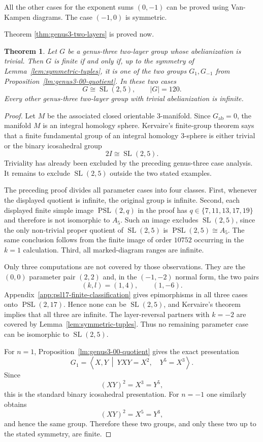 \documentclass{article}
\newtheorem{theorem}{Theorem}[section]
\begin{document}
All the other cases for the exponent sums $(0,-1)$ can be proved using Van-Kampen diagrams. The case $(-1,0)$ is symmetric.

Theorem \ref {thm:genus3-two-layers} is proved now.

\begin{theorem}
\label{thm:genus3-two-layer-finite-reduction}
Let $G$ be a genus-three two-layer group whose abelianization is trivial.
Then $G$ is finite if and only if, up to the symmetry of
Lemma~\ref{lem:symmetric-tuples}, it is one of the two groups $G_1,G_{-1}$
from Proposition~\ref{lm:genus3-00-quotient}.  In these two cases
\[
       G\cong\operatorname{SL}(2,5),
       \qquad |G|=120.
\]
Every other genus-three two-layer group with trivial abelianization is
infinite.
\end{theorem}

\begin{proof}
Let $M$ be the associated closed orientable $3$-manifold.  Since
$G_{\mathrm{ab}}=0$, the manifold $M$ is an integral homology sphere.
Kervaire's finite-group theorem says that a finite fundamental group of an
integral homology $3$-sphere is either trivial or the binary icosahedral
group
\[
       2I\cong\operatorname{SL}(2,5).
\]
Triviality has already been excluded by the preceding genus-three case
analysis.  It remains to exclude $\operatorname{SL}(2,5)$ outside the two
stated examples.

The preceding proof divides all parameter cases into four classes.  First,
whenever the displayed quotient is infinite, the original group is infinite.
Second, each displayed finite simple image
$\operatorname{PSL}(2,q)$ in the proof has
$q\in\{7,11,13,17,19\}$ and therefore is not isomorphic to $A_5$.
Such an image excludes $\operatorname{SL}(2,5)$, since the only non-trivial
proper quotient of $\operatorname{SL}(2,5)$ is
$\operatorname{PSL}(2,5)\cong A_5$.  The same conclusion follows from the
finite image of order $10752$ occurring in the $k=1$ calculation.  Third,
all marked-diagram ranges are infinite. 

Only three computations are not covered by those observations.  They are the
$(0,0)$ parameter pair $(2,2)$ and, in the $(-1,-2)$ normal form, the two
pairs
\[
       (k,l)=(1,4),\qquad (1,-6).
\]
Appendix~\ref{app:psl17-finite-classification} gives epimorphisms in all
three cases onto $\operatorname{PSL}(2,17)$.  Hence none can be
$\operatorname{SL}(2,5)$, and Kervaire's theorem implies that all three are
infinite.  The layer-reversal partners with $k=-2$ are covered by
Lemma~\ref{lem:symmetric-tuples}.  Thus no remaining parameter case can be
isomorphic to $\operatorname{SL}(2,5)$.

For $n=1$, Proposition~\ref{lm:genus3-00-quotient} gives the exact
presentation
\[
 G_1=\left\langle X,Y\ \middle|\
 YXY=X^2,\quad Y^5=X^3\right\rangle .
\]
Since
\[
       (XY)^2=X^3=Y^5,
\]
this is the standard binary icosahedral presentation.  For $n=-1$ one
similarly obtains
\[
       (XY)^2=X^5=Y^3,
\]
and hence the same group.  Therefore these two groups, and only these two up
to the stated symmetry, are finite.
\end{proof}
\end{document}
